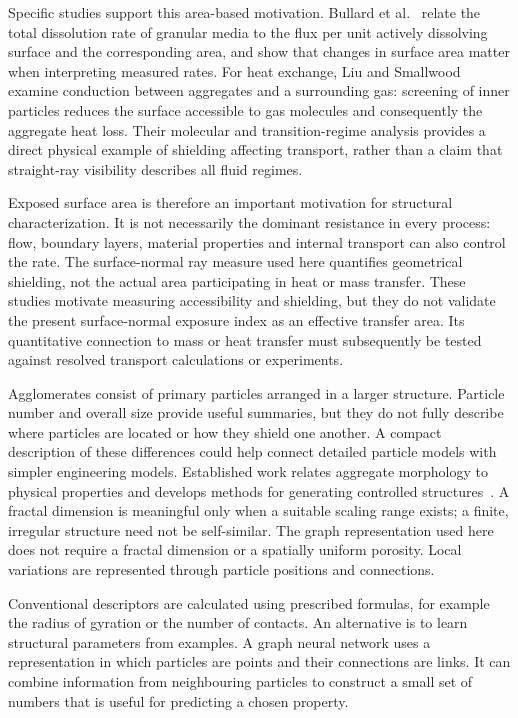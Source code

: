 \documentclass[11pt,a4paper]{article}
\begin{document}
Specific studies support this area-based motivation. Bullard et al.~\cite{Bullard2021} relate the total dissolution rate of granular media to the flux per unit actively dissolving surface and the corresponding area, and show that changes in surface area matter when interpreting measured rates. For heat exchange, Liu and Smallwood~\cite{Liu2008} examine conduction between aggregates and a surrounding gas: screening of inner particles reduces the surface accessible to gas molecules and consequently the aggregate heat loss. Their molecular and transition-regime analysis provides a direct physical example of shielding affecting transport, rather than a claim that straight-ray visibility describes all fluid regimes.

Exposed surface area is therefore an important motivation for structural characterization. It is not necessarily the dominant resistance in every process: flow, boundary layers, material properties and internal transport can also control the rate. The surface-normal ray measure used here quantifies geometrical shielding, not the actual area participating in heat or mass transfer. These studies motivate measuring accessibility and shielding, but they do not validate the present surface-normal exposure index as an effective transfer area. Its quantitative connection to mass or heat transfer must subsequently be tested against resolved transport calculations or experiments.

Agglomerates consist of primary particles arranged in a larger structure. Particle number and overall size provide useful summaries, but they do not fully describe where particles are located or how they shield one another. A compact description of these differences could help connect detailed particle models with simpler engineering models. Established work relates aggregate morphology to physical properties and develops methods for generating controlled structures~\cite{Filippov2000,Skorupski2014,Ehrl2009}. A fractal dimension is meaningful only when a suitable scaling range exists; a finite, irregular structure need not be self-similar. The graph representation used here does not require a fractal dimension or a spatially uniform porosity. Local variations are represented through particle positions and connections.

Conventional descriptors are calculated using prescribed formulas, for example the radius of gyration or the number of contacts. An alternative is to learn structural parameters from examples. A graph neural network uses a representation in which particles are points and their connections are links. It can combine information from neighbouring particles to construct a small set of numbers that is useful for predicting a chosen property.
\end{document}
